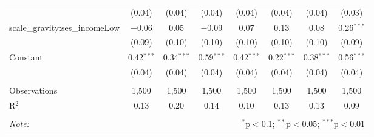 \documentclass[
]{article}
\begin{document}
\begin{sidewaystable}[!htbp]
\begin{tabular}{@{\extracolsep{1pt}}lccccccc}
  & (0.04) & (0.04) & (0.04) & (0.04) & (0.04) & (0.04) & (0.03) \\ 
  scale\_gravity:ses\_incomeLow & $-$0.06 & 0.05 & $-$0.09 & 0.07 & 0.13 & 0.08 & 0.26$^{***}$ \\ 
  & (0.09) & (0.10) & (0.10) & (0.10) & (0.10) & (0.10) & (0.09) \\ 
  Constant & 0.42$^{***}$ & 0.34$^{***}$ & 0.59$^{***}$ & 0.42$^{***}$ & 0.22$^{***}$ & 0.38$^{***}$ & 0.56$^{***}$ \\ 
  & (0.04) & (0.04) & (0.04) & (0.04) & (0.04) & (0.04) & (0.04) \\ 
 \hline \\[-1.8ex] 
Observations & 1,500 & 1,500 & 1,500 & 1,500 & 1,500 & 1,500 & 1,500 \\ 
R$^{2}$ & 0.13 & 0.20 & 0.14 & 0.10 & 0.13 & 0.13 & 0.09 \\ 
\hline 
\hline \\[-1.8ex] 
\textit{Note:}  & \multicolumn{7}{r}{$^{*}$p$<$0.1; $^{**}$p$<$0.05; $^{***}$p$<$0.01} \\ 
\end{tabular} 
\end{sidewaystable}
\end{document}
